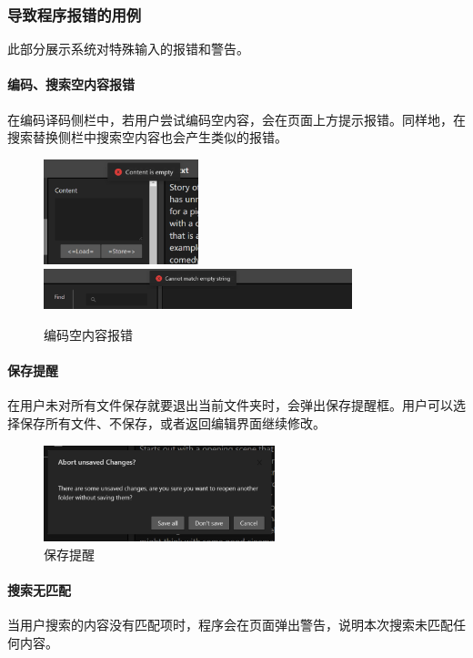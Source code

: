 \documentclass[scheme = chinese]{ctexart}
\begin{document}
\subsubsection{导致程序报错的用例}
此部分展示系统对特殊输入的报错和警告。

\paragraph{编码、搜索空内容报错}
在编码译码侧栏中，若用户尝试编码空内容，会在页面上方提示报错。同样地，在搜索替换侧栏中搜索空内容也会产生类似的报错。

\begin{figure}[H]
    \centering
    \includegraphics[width=0.4\textwidth]{images/问题-编码空内容报错.png} \\
    \includegraphics[width=0.8\textwidth]{images/问题-查找空内容.png}
    \caption{编码空内容报错}
\end{figure}

\paragraph{保存提醒}
在用户未对所有文件保存就要退出当前文件夹时，会弹出保存提醒框。用户可以选择保存所有文件、不保存，或者返回编辑界面继续修改。

\begin{figure}[H]
    \centering
    \includegraphics[width=0.6\textwidth]{images/问题-保存提醒.png}
    \caption{保存提醒}
\end{figure}

\paragraph{搜索无匹配}
当用户搜索的内容没有匹配项时，程序会在页面弹出警告，说明本次搜索未匹配任何内容。
\end{document}
